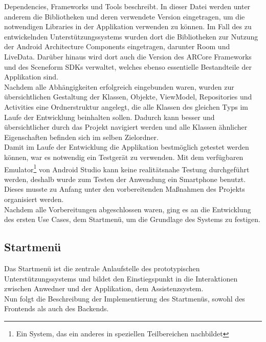 Dependencies, Frameworks und Tools beschreibt. In dieser Datei werden unter 
anderem die Bibliotheken und deren verwendete Version eingetragen, um die notwendigen Libraries in der Applikation verwenden zu können. Im Fall des zu 
entwickelnden Unterstützungssystems wurden dort die Bibliotheken zur Nutzung der Android Architecture Components eingetragen, darunter Room und LiveData. 
Darüber hinaus wird dort auch die Version des ARCore Frameworks und des Sceneform \acs{SDK}s verwaltet, welches ebenso essentielle Bestandteile der 
Applikation sind.
\\ 
Nachdem alle Abhängigkeiten erfolgreich eingebunden waren, wurden zur übersichtlichen Gestaltung der Klassen, Objekte, ViewModel, Repositories und Activities 
eine Ordnerstruktur angelegt, die alle Klassen des gleichen Typs im Laufe der Entwicklung beinhalten sollen. Dadurch kann besser und übersichtlicher durch 
das Projekt navigiert werden und alle Klassen ähnlicher Eigenschaften befinden sich im selben Zielordner. 
\\ 
\linebreak
Damit im Laufe der Entwicklung die Applikation bestmöglich getestet werden können, war es notwendig ein Testgerät zu verwenden. Mit dem verfügbaren 
Emulator\footnote{Ein System, das ein anderes in speziellen Teilbereichen nachbildet} von Android Studio kann keine realitätsnahe Testung 
durchgeführt werden, deshalb wurde zum Testen der Anwendung ein Smartphone benutzt. Dieses musste zu Anfang unter den vorbereitenden Maßnahmen des 
Projekts organisiert werden.
\\ 
\linebreak
Nachdem alle Vorbereitungen abgeschlossen waren, ging es an die Entwicklung des ersten Use Cases, dem Startmenü, um die Grundlage des Systems zu festigen.  

\subsection{Startmenü}
Das Startmenü ist die zentrale Anlaufstelle des prototypischen Unterstützungssystems und bildet den Einstiegspunkt in die Interaktionen zwischen Anwedner 
und der Applikation, dem Assistenzsystem.
\\ 
Nun folgt die Beschreibung der Implementierung des Startmenüs, sowohl des Frontends als auch des Backends.

